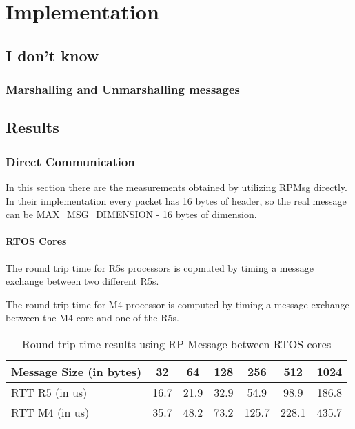 

\chapter{Implementation}

\section{I don't know}

\subsection{Marshalling and Unmarshalling messages}

\section{Results}

\subsection{Direct Communication}

In this section there are the measurements obtained by utilizing RPMsg
directly.
In their implementation every packet has 16 bytes of header, so the real
message can be MAX\_MSG\_DIMENSION - 16 bytes of dimension.

\subsubsection{RTOS Cores}

The round trip time for R5s processors is copmuted by timing a message exchange
between two different R5s.

The round trip time for M4 processor is computed by timing a message exchange
between the M4 core and one of the R5s.

\begin{table}
\centering
\caption{Round trip time results using RP Message between RTOS cores}
\label{table:direct_communication_RTOS_cores}
\begin{tabular}{lcccccc}
\toprule
Message Size (in bytes) & 32 & 64 & 128 & 256 & 512 & 1024 \\
\midrule
RTT R5 (in us) & 16.7 & 21.9 & 32.9 & 54.9 & 98.9 & 186.8 \\
RTT M4 (in us) & 35.7 & 48.2 & 73.2 & 125.7 & 228.1 & 435.7 \\
\bottomrule
\end{tabular}
\end{table}

